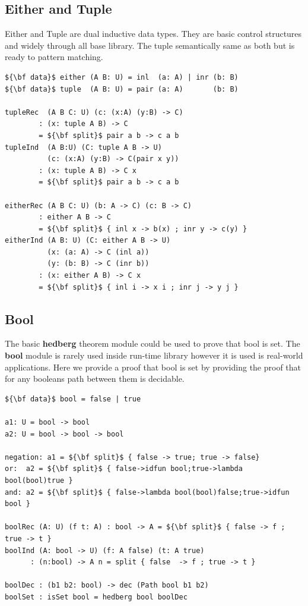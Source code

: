 \documentclass{article}
\begin{document}
\subsection{Either and Tuple}

Either and Tuple are dual inductive data types.
They are basic control structures and widely through all base library.
The tuple semantically same as both but is ready to pattern matching.

\begin{lstlisting}[mathescape=true]
${\bf data}$ either (A B: U) = inl  (a: A) | inr (b: B)
${\bf data}$ tuple  (A B: U) = pair (a: A)       (b: B)

tupleRec  (A B C: U) (c: (x:A) (y:B) -> C)
        : (x: tuple A B) -> C
        = ${\bf split}$ pair a b -> c a b
tupleInd  (A B:U) (C: tuple A B -> U)
          (c: (x:A) (y:B) -> C(pair x y))
        : (x: tuple A B) -> C x
        = ${\bf split}$ pair a b -> c a b

eitherRec (A B C: U) (b: A -> C) (c: B -> C)
        : either A B -> C
        = ${\bf split}$ { inl x -> b(x) ; inr y -> c(y) }
eitherInd (A B: U) (C: either A B -> U)
          (x: (a: A) -> C (inl a))
          (y: (b: B) -> C (inr b))
        : (x: either A B) -> C x
        = ${\bf split}$ { inl i -> x i ; inr j -> y j }

\end{lstlisting}

\subsection{Bool}

The basic {\bf hedberg} theorem module could be used to prove that bool is set.
The {\bf bool} module is rarely used inside run-time library
however it is used is real-world applications. Here we provide a proof
that bool is set by providing the proof that for any booleans path
between them is decidable.

\begin{lstlisting}[mathescape=true]
${\bf data}$ bool = false | true

a1: U = bool -> bool
a2: U = bool -> bool -> bool

negation: a1 = ${\bf split}$ { false -> true; true -> false}
or:  a2 = ${\bf split}$ { false->idfun bool;true->lambda bool(bool)true }
and: a2 = ${\bf split}$ { false->lambda bool(bool)false;true->idfun bool }

boolRec (A: U) (f t: A) : bool -> A = ${\bf split}$ { false -> f ; true -> t }
boolInd (A: bool -> U) (f: A false) (t: A true)
      : (n:bool) -> A n = split { false  -> f ; true -> t }

boolDec : (b1 b2: bool) -> dec (Path bool b1 b2)
boolSet : isSet bool = hedberg bool boolDec
\end{lstlisting}
\end{document}
